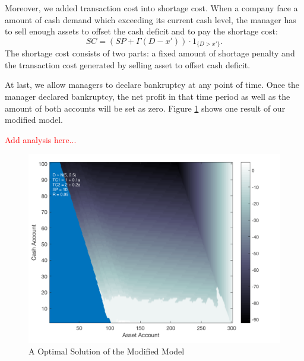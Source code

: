 \documentclass[12pt]{article}
\begin{document}
Moreover, we added transaction cost into shortage cost. When a company face a amount of cash demand which exceeding its current cash level, the manager has to sell enough assets to offset the cash deficit and to pay the shortage cost: $$SC = (SP + \Gamma(D-x')) \cdot 1_{\{D>x'\}}.$$ The shortage cost consists of two parts: a fixed amount of shortage penalty and the transaction cost generated by selling asset to offset cash deficit. 

At last, we allow managers to declare bankruptcy at any point of time. Once the manager declared bankruptcy, the net profit in that time period as well as the amount of both accounts will be set as zero. Figure \ref{ModifiedModel} shows one result of our modified model.

\textcolor{red}{Add analysis here...}


\begin{figure}
\begin{center}
\includegraphics[scale=.3]{ModifiedModel}
\end{center}
\caption{A Optimal Solution of the Modified Model}
\label{ModifiedModel}
\end{figure}
\end{document}
